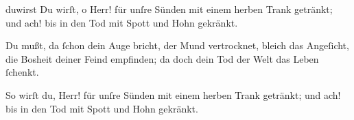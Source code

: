 \documentclass{ees}
\begin{document}
{  \begin{movement}{duwirst}
    Du wirſt, o Herr! für unſre Sünden
    mit einem herben Trank getränkt;
    und ach! bis in den Tod mit Spott und Hohn gekränkt.

    Du mußt, da ſchon dein Auge bricht,
    der Mund vertrocknet, bleich das Angeſicht,
    die Bosheit deiner Feind empfinden;
    da doch dein Tod der Welt das Leben ſchenkt.

    So wirſt du, Herr! für unſre Sünden
    mit einem herben Trank getränkt;
    und ach! bis in den Tod mit Spott und Hohn gekränkt.
  \end{movement}
}

\eesScore
\end{document}
